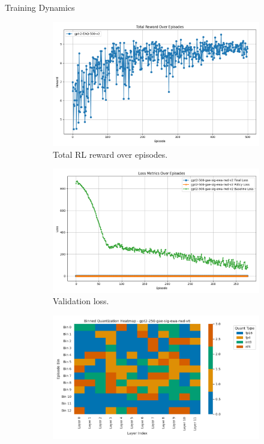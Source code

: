 \documentclass[final]{beamer}
\newlength{\colwidth}
\begin{document}
\begin{frame}[t]
\begin{columns}[t]
\begin{column}{\colwidth}
				
				\begin{block}{Training Dynamics}
					\vspace{-0.6em}
					\begin{figure}[ht]
						\centering
						\begin{subfigure}[b]{0.32\linewidth}
							\includegraphics[width=\linewidth]{gpt-2-EAQ-500-v2-reward.png}
							\caption{\small Total RL reward over episodes.}
						\end{subfigure}
						\hfill
						\begin{subfigure}[b]{0.32\linewidth}
							\includegraphics[width=\linewidth]{gpt2-500-gae-sig-ewa-rwd-v2-losses.png}
							\caption{\small Validation loss.}
						\end{subfigure}
						\hfill
						\begin{subfigure}[b]{0.3\linewidth}
							\includegraphics[width=\linewidth]{gpt2-250-gae-sig-ewa-rwd-v6_quant_heatmap_binned.png}

\end{subfigure}
\end{figure}
\end{block}
\end{column}
\end{columns}
\end{frame}
\end{document}
